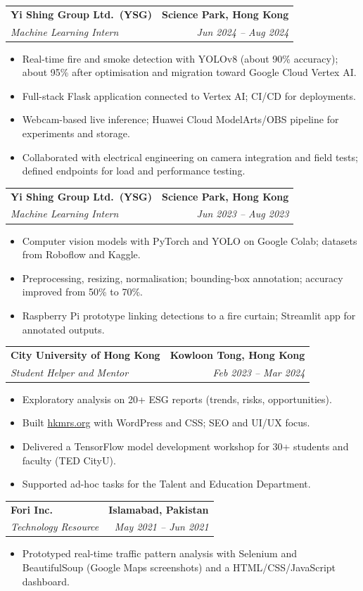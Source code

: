 \documentclass[10pt,a4paper]{article}
\makeatletter
\newcommand{\resumeSubheading}[4]{%
  \vspace{0.6em}%
  \begin{tabular*}{\textwidth}{l@{\extracolsep{\fill}}r}
    \textbf{#1} & \textbf{#2} \\
    \textit{\small #3} & \textit{\small #4} \\
  \end{tabular*}\vspace{0.32em}}
\makeatother
\begin{document}
\resumeSubheading{Yi Shing Group Ltd.\ (YSG)}{Science Park, Hong Kong}{Machine Learning Intern}{Jun 2024 -- Aug 2024}
\begin{itemize}
  \item Real-time fire and smoke detection with YOLOv8 (about 90\% accuracy); about 95\% after optimisation and migration toward Google Cloud Vertex AI.
  \item Full-stack Flask application connected to Vertex AI; CI/CD for deployments.
  \item Webcam-based live inference; Huawei Cloud ModelArts/OBS pipeline for experiments and storage.
  \item Collaborated with electrical engineering on camera integration and field tests; defined endpoints for load and performance testing.
\end{itemize}

\resumeSubheading{Yi Shing Group Ltd.\ (YSG)}{Science Park, Hong Kong}{Machine Learning Intern}{Jun 2023 -- Aug 2023}
\begin{itemize}
  \item Computer vision models with PyTorch and YOLO on Google Colab; datasets from Roboflow and Kaggle.
  \item Preprocessing, resizing, normalisation; bounding-box annotation; accuracy improved from 50\% to 70\%.
  \item Raspberry Pi prototype linking detections to a fire curtain; Streamlit app for annotated outputs.
\end{itemize}

\resumeSubheading{City University of Hong Kong}{Kowloon Tong, Hong Kong}{Student Helper and Mentor}{Feb 2023 -- Mar 2024}
\begin{itemize}
  \item Exploratory analysis on 20+ ESG reports (trends, risks, opportunities).
  \item Built \href{https://hkmrs.org}{hkmrs.org} with WordPress and CSS; SEO and UI/UX focus.
  \item Delivered a TensorFlow model development workshop for 30+ students and faculty (TED CityU).
  \item Supported ad-hoc tasks for the Talent and Education Department.
\end{itemize}

\resumeSubheading{Fori Inc.}{Islamabad, Pakistan}{Technology Resource}{May 2021 -- Jun 2021}
\begin{itemize}
  \item Prototyped real-time traffic pattern analysis with Selenium and BeautifulSoup (Google Maps screenshots) and a HTML/CSS/JavaScript dashboard.
\end{itemize}
\end{document}
